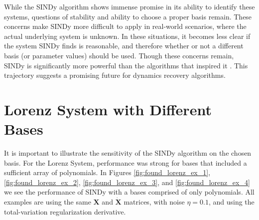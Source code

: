 \documentclass[10pt]{paper}
\begin{document}
While the SINDy algorithm shows immense promise in its ability to identify these systems, questions of stability and ability to choose a proper basis remain. These concerns make SINDy more difficult to apply in real-world scenarios, where the actual underlying system is unknown. 
In these situations, it becomes less clear if the system SINDy finds is reasonable, and therefore whether or not a different basis (or parameter values) should be used.
Though these concerns remain, SINDy is significantly more powerful than the algorithms that inspired it \cite{bongard}\cite{schmidt}. This trajectory suggests a promising future for dynamics recovery algorithms.  










\appendix 
\newpage 
\section{Lorenz System with Different Bases} \label{apx:lorenz_with_diff_bases}
It is important to illustrate the sensitivity of the SINDy algorithm on the chosen basis. For the Lorenz System, performance was strong for bases that included a sufficient array of polynomials. 
In Figures \ref{fig:found_lorenz_ex_1}, \ref{fig:found_lorenz_ex_2}, \ref{fig:found_lorenz_ex_3}, and \ref{fig:found_lorenz_ex_4} we see the performance of SINDy with a bases comprised of only polynomials. 
All examples are using the same $\mathbf X$ and $\mathbf {\dot X}$ matrices, with noise $\eta = 0.1$, and using the total-variation regularization derivative.
\end{document}
